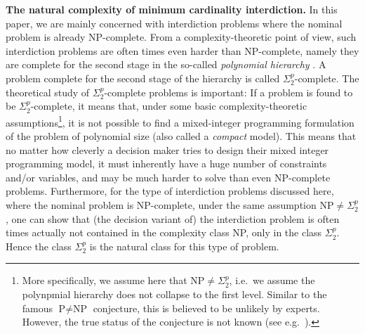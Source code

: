 \textbf{The natural complexity of minimum cardinality interdiction.}
In this paper, we are mainly concerned with interdiction problems where the nominal problem is already NP-complete. From a complexity-theoretic point of view, such interdiction problems are often times even harder than NP-complete, namely they are complete for the second stage in the so-called \emph{polynomial hierarchy} \cite{DBLP:journals/tcs/Stockmeyer76}. A problem complete for the second stage of the hierarchy is called $\Sigma^p_2$-complete. 
The theoretical study of $\Sigma^p_2$-complete problems is important:
If a problem is found to be $\Sigma^p_2$-complete, it means that, under some basic complexity-theoretic assumptions\footnote{More specifically, we assume here that $\text{NP} \neq \Sigma^p_2$, i.e.\ we assume the polynpmial hierarchy does not collapse to the first level. Similar to the famous $\text{P} \neq \text{NP}$ conjecture, this is believed to be unlikely by experts.
However, the true status of the conjecture is not known
(see e.g.\ \cite{DBLP:journals/4or/Woeginger21}).}, it is not possible to find a mixed-integer programming formulation of the problem of polynomial size \cite{DBLP:journals/4or/Woeginger21} (also called a \emph{compact} model).
This means that no matter how cleverly a decision maker tries to design their mixed integer programming model, it must inherently have a huge number of constraints and/or variables, and may be much harder to solve than even NP-complete problems. 
Furthermore, for the type of interdiction problems discussed here, where the nominal problem is NP-complete, 
under the same assumption $\text{NP} \neq \Sigma^p_2$, one can show that (the decision variant of) the interdiction problem is often times actually not contained in the complexity class NP, only in the class $\Sigma^p_2$.
Hence the class $\Sigma^p_2$ is the natural class for this type of problem.

